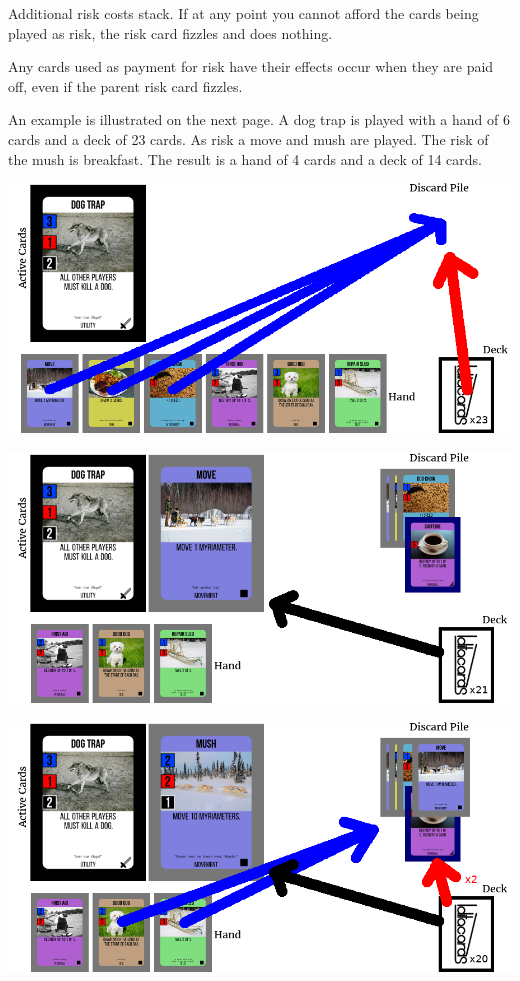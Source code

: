 \documentclass{article}
\begin{document}
Additional risk costs stack. If at any point you cannot afford the cards being
played as risk, the risk card fizzles and does nothing.

Any cards used as payment for risk have their effects occur when they are paid
off, even if the parent risk card fizzles.

An example is illustrated on the next page. A dog trap is played with a hand of
6 cards and a deck of 23 cards. As risk a move and mush are played. The risk of
the mush is breakfast. The result is a hand of 4 cards and a deck of 14 cards.

\clearpage

\includegraphics{images/rules/example_1}\par
\includegraphics{images/rules/example_2}\par
\includegraphics{images/rules/example_3}\par
\end{document}
